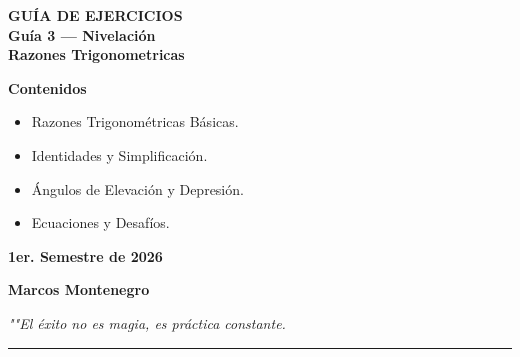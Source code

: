 \documentclass[letterpaper, 12pt]{article}
\begin{document}
\vspace*{0.5cm} 

\begin{center}
    \color{azulFuerte}
    {\huge \textbf{GUÍA DE EJERCICIOS }} \\
    \vspace{0.3cm}
    {\Large \textbf{Guía 3 — Nivelación}} \\
    \vspace{0.3cm}
    {\Huge \textbf{Razones Trigonometricas}} \\
    \vspace{1.5cm}
    
    \begin{tcolorbox}[colback=celesteSuave, colframe=azulFuerte, arc=10pt, width=0.85\textwidth, center, boxrule=1.5pt]
        \centering
        \vspace{0.2cm}
        {\Large \textbf{Contenidos}}
        \vspace{0.3cm}
        \color{black}
        \begin{itemize}[leftmargin=3cm]
            \item[\color{azulFuerte} $\Rightarrow$] Razones Trigonométricas Básicas.
            \item[\color{azulFuerte} $\Rightarrow$] Identidades y Simplificación.
            \item[\color{azulFuerte} $\Rightarrow$] Ángulos de Elevación y Depresión.
            \item[\color{azulFuerte} $\Rightarrow$] Ecuaciones y Desafíos.
        \end{itemize}
        \vspace{0.2cm}
    \end{tcolorbox}
\end{center}

\vspace{1.5cm}

\begin{center}
    {\Large \textbf{1er. Semestre de 2026}} 
    
    \vspace{0.8cm}
    
    {\large \textbf{Marcos Montenegro}} 
    
    \vspace{0.8cm}
    
   
    
    \vspace{0.5cm}
    
    \textit{\small ""El éxito no es magia, es práctica constante.}
    
    \vspace{0.3cm}
    
    \textcolor{negro}{\rule{8cm}{0.4pt}}
\end{center}
\end{document}
